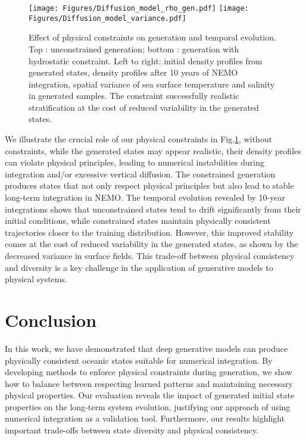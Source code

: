 \documentclass{article}
\begin{document}
\begin{figure}[htb]
    \centering
    \vspace{-0.1cm}
    \texttt{[image: Figures/Diffusion\_model\_rho\_gen.pdf]}%
    \hfill
    \texttt{[image: Figures/Diffusion\_model\_variance.pdf]}%
    \caption{Effect of physical constraints on generation and temporal evolution. Top : unconstrained generation; bottom : generation with hydrostatic constraint. Left to right: initial density profiles from generated states, density profiles after 10 years of NEMO integration, spatial variance of sea surface temperature and salinity in generated samples. The constraint successfully realistic stratification at the cost of reduced variability in the generated states.}
    \label{fig:res-2}
\end{figure}
\vspace{-0.22cm}

We illustrate the crucial role of our physical constraints in Fig.\ref{fig:res-2}, without constraints, while the generated states may appear realistic, their density profiles can violate physical principles, leading to numerical instabilities during integration and/or excessive vertical diffusion. The constrained generation produces states that not only respect physical principles but also lead to stable long-term integration in NEMO. The temporal evolution revealed by 10-year integrations shows that unconstrained states tend to drift significantly from their initial conditions, while constrained states maintain physically consistent trajectories closer to the training distribution. However, this improved stability comes at the cost of reduced variability in the generated states, as shown by the decreased variance in surface fields. This trade-off between physical consistency and diversity is a key challenge in the application of generative models to physical systems. %
\vspace{-0.3cm}

\section{Conclusion}

In this work, we have demonstrated that deep generative models can produce physically consistent oceanic states suitable for numerical integration. By developing methods to enforce physical constraints during generation, we show how to balance between respecting learned patterns and maintaining necessary physical properties. Our evaluation reveals the impact of generated initial state properties on the long-term system evolution, justifying our approach of using numerical integration as a validation tool. Furthermore, our results highlight important trade-offs between state diversity and physical consistency.
\end{document}
